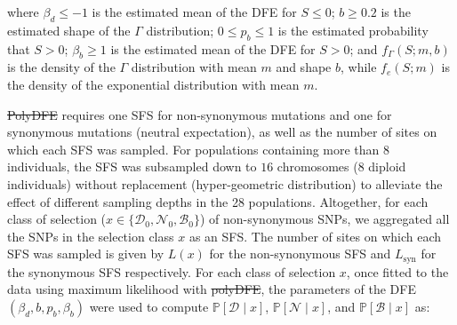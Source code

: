\documentclass{article}
\newcommand{\proba}{\mathbb{P}}
\newcommand{\SphyDel}{\mathcal{D}_0}
\newcommand{\SphyNeu}{\mathcal{N}_0}
\newcommand{\SphyBen}{\mathcal{B}_0}
\newcommand{\Sphyclass}{x}
\newcommand{\given}{\mid}
\newcommand{\Spop}{S}
\newcommand{\SpopDel}{\mathcal{D}}
\newcommand{\SpopNeu}{\mathcal{N}}
\newcommand{\SpopBen}{\mathcal{B}}
\newcommand{\AdvMean}{\beta_b}
\newcommand{\DelMean}{\beta_d}
\providecommand{\DIFaddtex}[1]{{\protect\color{blue}\uwave{#1}}} %
\providecommand{\DIFdeltex}[1]{{\protect\color{red}\sout{#1}}}                      %
\providecommand{\DIFaddbegin}{} %
\providecommand{\DIFaddend}{} %
\providecommand{\DIFdelbegin}{} %
\providecommand{\DIFdelend}{} %
\providecommand{\DIFadd}[1]{\texorpdfstring{\DIFaddtex{#1}}{#1}} %
\providecommand{\DIFdel}[1]{\texorpdfstring{\DIFdeltex{#1}}{}} %
\newcommand{\DIFscaledelfig}{0.5}
\newlength{\DIFdelgraphicswidth} %
\newlength{\DIFdelgraphicsheight} %
\newcommand{\DIFaddincludegraphics}[2][]{{\color{blue}\fbox{\DIFOincludegraphics[#1]{#2}}}} %
\newcommand{\DIFdelincludegraphics}[2][]{%
\sbox{\DIFdelgraphicsbox}{\DIFOincludegraphics[#1]{#2}}%
\settoboxwidth{\DIFdelgraphicswidth}{\DIFdelgraphicsbox} %
\settoboxtotalheight{\DIFdelgraphicsheight}{\DIFdelgraphicsbox} %
\scalebox{\DIFscaledelfig}{%
\parbox[b]{\DIFdelgraphicswidth}{\usebox{\DIFdelgraphicsbox}\\[-\baselineskip] \rule{\DIFdelgraphicswidth}{0em}}\llap{\resizebox{\DIFdelgraphicswidth}{\DIFdelgraphicsheight}{%
\setlength{\unitlength}{\DIFdelgraphicswidth}%
\begin{picture}(1,1)%
\thicklines\linethickness{2pt} %
{\color[rgb]{1,0,0}\put(0,0){\framebox(1,1){}}}%
{\color[rgb]{1,0,0}\put(0,0){\line( 1,1){1}}}%
{\color[rgb]{1,0,0}\put(0,1){\line(1,-1){1}}}%
\end{picture}%
}\hspace*{3pt}}} %
} %
\DeclareRobustCommand{\DIFaddbegin}{\DIFOaddbegin \let\includegraphics\DIFaddincludegraphics} %
\DeclareRobustCommand{\DIFaddend}{\DIFOaddend \let\includegraphics\DIFOincludegraphics} %
\DeclareRobustCommand{\DIFdelbegin}{\DIFOdelbegin \let\includegraphics\DIFdelincludegraphics} %
\DeclareRobustCommand{\DIFdelend}{\DIFOaddend \let\includegraphics\DIFOincludegraphics} %
\begin{document}
    where $\DelMean \leq -1 $ is the estimated mean of the DFE for $\Spop \leq 0$;
    $b \geq 0.2$ is the estimated shape of the $\Gamma$ distribution;
    $0 \leq p_b \leq 1$ is the estimated probability that $\Spop > 0$;
    $\AdvMean \geq 1$ is the estimated mean of the DFE for $\Spop > 0$;
    and $f_{\Gamma}(\Spop; m, b)$ is the density of the $\Gamma$ distribution with mean $m$ and shape $b$, while $f_{e}(\Spop; m)$ is the density of the exponential distribution with mean $m$.

    \DIFdelbegin \DIFdel{PolyDFE }\DIFdelend \DIFaddbegin \textit{\DIFadd{PolyDFE}} \DIFaddend requires one SFS for non-synonymous mutations and one for synonymous mutations (neutral expectation), as well as the number of sites on which each SFS was sampled.
    For populations containing more than $8$ individuals, the SFS was subsampled down to $16$ chromosomes ($8$ diploid individuals) without replacement (hyper-geometric distribution) to alleviate the effect of different sampling depths in the 28 populations.
    Altogether, for each class of selection ($\Sphyclass \in \{\SphyDel, \SphyNeu, \SphyBen \}$) of non-synonymous SNPs, we aggregated all the SNPs in the selection class $\Sphyclass$ as an SFS.
    The number of sites on which each SFS was sampled is given by $L(\Sphyclass)$ for the non-synonymous SFS and $L_{\text{syn}}$ for the synonymous SFS respectively.
    For each class of selection $\Sphyclass$, once fitted to the data using maximum likelihood with \DIFdelbegin \DIFdel{polyDFE}\DIFdelend \DIFaddbegin \textit{\DIFadd{polyDFE}}\DIFaddend , the parameters of the DFE $\left( \DelMean , b, p_b, \AdvMean \right)$ were used to compute $\proba [ \SpopDel \given  \Sphyclass] $, $\proba [ \SpopNeu \given \Sphyclass]$, and $\proba [ \SpopBen \given \Sphyclass]$ as:
\end{document}
